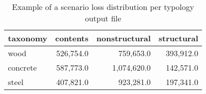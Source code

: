 \begin{table}[htbp]
\centering
\begin{tabular}{lrrr}
\hline
\rowcolor{lightgray}
\textbf{taxonomy} & \textbf{contents} & \textbf{nonstructural} & \textbf{structural} \\ \hline
wood & 526,754.0 & 759,653.0 & 393,912.0 \\
concrete & 587,773.0 & 1,074,620.0 & 142,571.0 \\
steel & 407,821.0 & 923,281.0 & 197,341.0 \\
\hline
\end{tabular}
\caption{Example of a scenario loss distribution per typology output file}
\label{output:scenario_loss_taxonomy}
\end{table}

